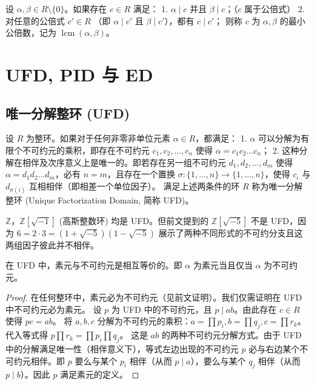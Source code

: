 \documentclass[11pt]{article}
\begin{document}
\begin{cndefinition}
设 $\alpha, \beta \in R\setminus\{0\}$。如果存在 $c \in R$ 满足：
1. $\alpha \mid c$ 并且 $\beta \mid c$；（$c$ 属于公倍式）
2. 对任意的公倍式 $c' \in R$ （即 $\alpha \mid c'$ 且 $\beta \mid c'$），都有 $c \mid c'$；
则称 $c$ 为 $\alpha, \beta$ 的最小公倍数，记为 $\operatorname{lcm}(\alpha, \beta)$。
\end{cndefinition}

\section{UFD, PID 与 ED}
\subsection{唯一分解整环 (UFD)}
\begin{cndefinition}[唯一分解整环]
设 $R$ 为整环。如果对于任何非零非单位元素 $\alpha \in R$，都满足：
1. $\alpha$ 可以分解为有限个不可约元的乘积，即存在不可约元 $c_1, c_2, \dots, c_n$ 使得 $\alpha = c_1 c_2 \dots c_n$；
2. 这种分解在相伴及次序意义上是唯一的。即若存在另一组不可约元 $d_1, d_2, \dots, d_m$ 使得 $\alpha = d_1 d_2 \dots d_m$，必有 $n = m$，且存在一个置换 $\sigma: \{1, \dots, n\} \to \{1, \dots, n\}$，使得 $c_i$ 与 $d_{\sigma(i)}$ 互相相伴（即相差一个单位因子）。
满足上述两条件的环 $R$ 称为唯一分解整环 (Unique Factorization Domain, 简称 UFD)。
\end{cndefinition}
\begin{cnexample}
$\mathbb{Z}$，$\mathbb{Z}[\sqrt{-1}]$ (高斯整数环) 均是 UFD。但前文提到的 $\mathbb{Z}[\sqrt{-5}]$ 不是 UFD，因为 $6 = 2 \cdot 3 = (1+\sqrt{-5})(1-\sqrt{-5})$ 展示了两种不同形式的不可约分支且这两组因子彼此并不相伴。
\end{cnexample}
\begin{cnproperty}
在 UFD 中，素元与不可约元是相互等价的。即 $\alpha$ 为素元当且仅当 $\alpha$ 为不可约元。
\end{cnproperty}
\begin{proof}
在任何整环中，素元必为不可约元（见前文证明）。我们仅需证明在 UFD 中不可约元必为素元。
设 $p$ 为 UFD 中的不可约元，且 $p \mid ab$。由此存在 $c \in R$ 使得 $pc = ab$。
将 $a, b, c$ 分解为不可约元的乘积：$a = \prod p_i, b = \prod q_j, c = \prod r_k$。
代入等式得 $p \prod r_k = \prod p_i \prod q_j$。
这是 $ab$ 的两种不可约元分解方式。由于 UFD 中的分解满足唯一性（相伴意义下），等式左边出现的不可约元 $p$ 必与右边某个不可约元相伴。即 $p$ 要么与某个 $p_i$ 相伴（从而 $p \mid a$），要么与某个 $q_j$ 相伴（从而 $p \mid b$）。因此 $p$ 满足素元的定义。
\end{proof}
\end{document}
